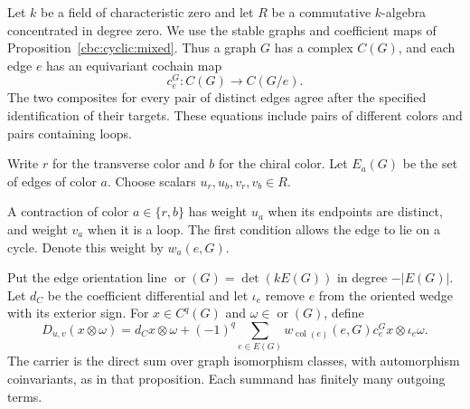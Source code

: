Let $k$ be a field of characteristic zero and let $R$ be a commutative $k$-algebra concentrated in degree zero.
We use the stable graphs and coefficient maps of Proposition~\ref{cbc:cyclic:mixed}.
Thus a graph $G$ has a complex $C(G)$, and each edge $e$ has an equivariant cochain map
\[
 c_e^G:C(G)\longrightarrow C(G/e).
\]
The two composites for every pair of distinct edges agree after the specified identification of their targets.
These equations include pairs of different colors and pairs containing loops.

Write $r$ for the transverse color and $b$ for the chiral color.
Let $E_a(G)$ be the set of edges of color $a$.
Choose scalars $u_r,u_b,v_r,v_b\in R$.

A contraction of color $a\in\{r,b\}$ has weight $u_a$ when its endpoints are distinct, and weight $v_a$ when it is a loop.
The first condition allows the edge to lie on a cycle.
Denote this weight by $w_a(e,G)$.

Put the edge orientation line $\operatorname{or}(G)=\det(kE(G))$ in degree $-|E(G)|$.
Let $d_C$ be the coefficient differential and let $\iota_e$ remove $e$ from the oriented wedge with its exterior sign.
For $x\in C^q(G)$ and $\omega\in\operatorname{or}(G)$, define
\begin{equation}\label{eq:cbc:two-edge:weighted-d}
 D_{u,v}(x\otimes\omega)
 =d_Cx\otimes\omega
 +(-1)^q\sum_{e\in E(G)}w_{\operatorname{col}(e)}(e,G)
       c_e^Gx\otimes\iota_e\omega.
\end{equation}
The carrier is the direct sum over graph isomorphism classes, with automorphism coinvariants, as in that proposition.
Each summand has finitely many outgoing terms.

